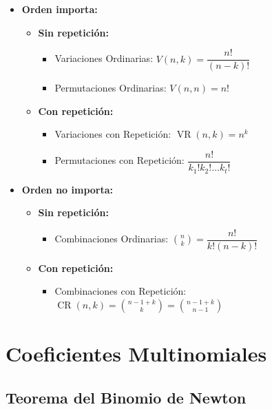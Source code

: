 \documentclass[a4paper,12pt]{article}
\begin{document}
\begin{procedimiento}[title=Seleccionar $n$ elementos de $k$ en $k$]
\begin{itemize}
    \item \textbf{Orden importa:}
    \begin{itemize}
        \item \textbf{Sin repetición:}
        \begin{itemize}
            \item Variaciones Ordinarias: $V(n,k) = \dfrac{n!}{(n-k)!}$
            \item Permutaciones Ordinarias: $V(n,n) = n!$
        \end{itemize}
        \item \textbf{Con repetición:}
        \begin{itemize}
            \item Variaciones con Repetición: $\operatorname{VR}(n,k) = n^k$
            \item Permutaciones con Repetición: $\dfrac{n!}{k_1!k_2!\dots k_t!}$
        \end{itemize}
    \end{itemize}

    \item \textbf{Orden no importa:}
    \begin{itemize}
        \item \textbf{Sin repetición:}
        \begin{itemize}
            \item Combinaciones Ordinarias: $\binom{n}{k} = \dfrac{n!}{k!(n-k)!}$
        \end{itemize}
        \item \textbf{Con repetición:}
        \begin{itemize}
            \item Combinaciones con Repetición: $\operatorname{CR}(n,k) = \binom{n-1+k}{k} = \binom{n-1+k}{n-1}$
        \end{itemize}
    \end{itemize}
\end{itemize}
\end{procedimiento}


\section{Coeficientes Multinomiales}

\subsection{Teorema del Binomio de Newton}
\end{document}
